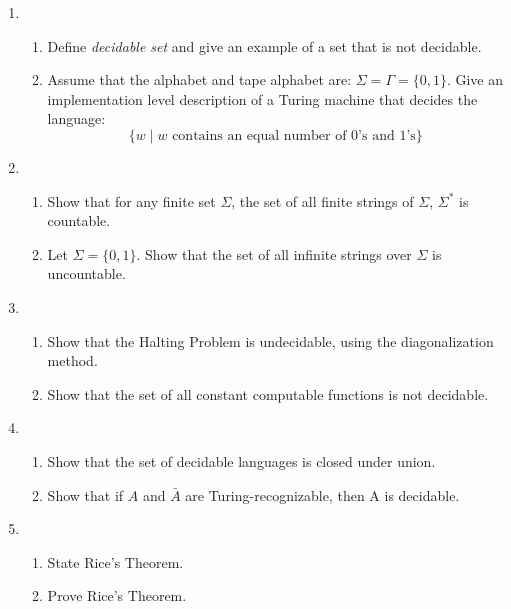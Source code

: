 \documentclass[11pt]{article}
\begin{document}
\begin{enumerate}
\item
\begin{enumerate}
	\item Define {\em decidable set} and give an example of a set that is not decidable.
	\item Assume that the alphabet and tape alphabet are: 
		$\Sigma = \Gamma = \{0,1\}$.
		Give an implementation level description of a Turing machine that
		decides the language: 
		$$
			\{w\mid \mbox{$w$ contains an equal number of 0's and 1's}\}
		$$
\end{enumerate}

\item 
\begin{enumerate}
	\item Show that for any finite set $\Sigma$, the set of all finite strings of $\Sigma$, 
		$\Sigma^*$ is countable.
	\item Let $\Sigma = \{0,1\}$.  Show that the set of all infinite strings over $\Sigma$ is 		uncountable.
\end{enumerate}
\item 
\begin{enumerate}
	\item Show that the Halting Problem is undecidable, using the diagonalization method.
	\item Show that the set of all constant computable functions is not decidable.
\end{enumerate}
\item
\begin{enumerate}
	\item Show that the set of decidable languages is closed under union.
	\item Show that if $A$ and $\bar{A}$ are Turing-recognizable, then A is decidable.
\end{enumerate} 
\item 
\begin{enumerate}
	\item State Rice's Theorem.
	\item Prove Rice's Theorem.
\end{enumerate}


\end{enumerate}
\end{document}
